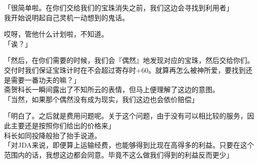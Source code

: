 「很简单啦。在你们交给我们的宝珠消失之前，我们这边会寻找到利用者」\\

我开始说明起自己灵机一动想到的鬼话。

哎呀，管他什么计划啦，不知道。\\

「诶？」

「然后，在你们需要的时候，我们会『偶然』地发现对应的宝珠，然后交给你们。交付时我们保证宝珠计时在不会超过寄存时+60。就算再怎么被神所爱，要找到还是需要一番功夫的嘛？」\\

斋贺科长一瞬间露出了不知所云的表情，但马上便理解了这边的意图。\\

「当然，如果那个偶然没有成为现实，我们这边也会依价赔偿」

「明白了。之后就是费用问题呢。关于这个问题，由于没有可以相比较的服务，因此主要还是按照你们给出的价格来」\\

科长如同投降般抬了抬手说道。\\

「对JDA来说，即便算上运输经费，也能够得到比现在高得多的利益。只要在这个范围内的话，我想这边都会同意。毕竟不这么做我们得到的利益反而更少」\\

